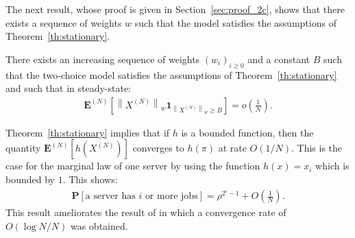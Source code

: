 \documentclass[sigconf]{acmart}
\newcommand\XN{X^{(N)}}
\newcommand\espN[1]{\mathbf{E}^{(N)}\left[#1\right]}
\newcommand\sespN[1]{\mathbf{E}^{(N)}[#1]}
\newcommand\Proba[1]{\mathbf{P}\left[#1\right]}
\newcommand\norm[1]{\left\|#1\right\|}
\newcommand\p[1]{\left(#1\right)}
\begin{document}
The next result, whose proof is given in Section~\ref{sec:proof_2c},
shows that there exists a sequence of weights $w$ such that the model
satisfies the assumptions of
Theorem~\ref{th:stationary}. 
\begin{theorem}
  \label{th:two-choice}
  There exists an increasing sequence of weights $(w_i)_{i\ge0}$ and a
  constant $B$ such that the two-choice model satisfies the
  assumptions of Theorem~\ref{th:stationary} and such that in
  steady-state:
  \begin{align}
    \label{eq:bound_2c}
    \espN{\norm{\XN}_w\mathbf{1}_{\norm{\XN}_w\ge B}}=o\p{\frac1{N}}.
  \end{align}
\end{theorem}

Theorem~\ref{th:stationary} implies that if $h$ is a bounded function,
then the quantity $\sespN{h(\XN)}$ converges to $h(\pi)$ at rate
$O(1/N)$. This is the case for the marginal law of one server by using
the function $h(x)=x_i$ which is bounded by $1$. This shows:
\begin{align*}
  \Proba{\text{a server has $i$ or more jobs}} = \rho^{2^i-1} +
  O\p{\frac1N}. 
\end{align*}
This result ameliorates the result of \cite{luczak2007asymptotic} in
which a convergence rate of $O(\log N/N)$ was obtained. 
\end{document}
